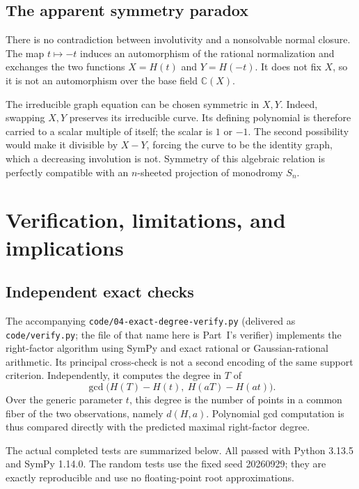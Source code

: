 \documentclass[11pt,letterpaper]{article}
\theoremstyle{definition}
\theoremstyle{remark}
\newcommand{\C}{\mathbb C}
\begin{document}
\subsection{The apparent symmetry paradox}

There is no contradiction between involutivity and a nonsolvable normal closure.
The map $t\mapsto-t$ induces an automorphism of the rational normalization and
exchanges the two functions $X=H(t)$ and $Y=H(-t)$. It does not fix $X$, so it is
not an automorphism over the base field $\C(X)$.

The irreducible graph equation can be chosen symmetric in $X,Y$. Indeed, swapping
$X,Y$ preserves its irreducible curve. Its defining polynomial is therefore
carried to a scalar multiple of itself; the scalar is $1$ or $-1$. The second
possibility would make it divisible by $X-Y$, forcing the curve to be the
identity graph, which a decreasing involution is not. Symmetry of this algebraic
relation is perfectly compatible with an $n$-sheeted projection of monodromy $S_n$.

\section{Verification, limitations, and implications}
\label{nrr:ed:sec:verification}

\subsection{Independent exact checks}

The accompanying \nolinkurl{code/04-exact-degree-verify.py} (delivered as
\texttt{code/verify.py}; the file of that name here is Part~I's verifier) implements the right-factor algorithm
using SymPy and exact rational or Gaussian-rational arithmetic. Its principal
cross-check is not a second encoding of the same support criterion. Independently,
it computes the degree in $T$ of
\begin{equation}
 \gcd\bigl(H(T)-H(t),\ H(aT)-H(at)\bigr).
 \label{nrr:ed:eq:fiber-gcd}
\end{equation}
Over the generic parameter $t$, this degree is the number of points in a common
fiber of the two observations, namely $d(H,a)$. Polynomial gcd computation is
thus compared directly with the predicted maximal right-factor degree.

The actual completed tests are summarized below. All passed with Python 3.13.5
and SymPy 1.14.0. The random tests use the fixed seed 20260929; they are exactly
reproducible and use no floating-point root approximations.
\end{document}
